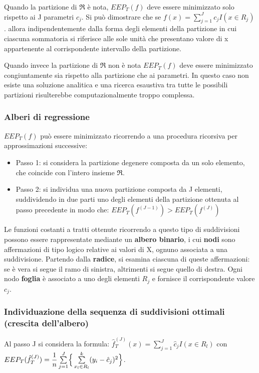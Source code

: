 \documentclass[a4paper]{extarticle}
\begin{document}
Quando la partizione di $\Re$ è nota, $EEP_T(f)$ deve essere minimizzato solo rispetto ai J parametri $c_j$. Si può dimostrare che se $f(x) =  \sum\limits_{j=1}^J c_jI (x \in R_j)$. allora indipendentemente dalla forma degli elementi della partizione in cui ciascuna sommatoria si riferisce alle sole unità che presentano valore di x appartenente al corrispondente intervallo della partizione.

Quando invece la partizione di $\Re$ non è nota $EEP_T(f)$ deve essere minimizzato congiuntamente sia rispetto alla partizione che ai parametri. In questo caso non esiste una soluzione analitica e una ricerca esaustiva tra tutte le possibili partizioni risulterebbe computazionalmente troppo complessa.

\subsubsection{Alberi di regressione}

$EEP_T(f)$ può essere minimizzato ricorrendo a una procedura ricorsiva per approssimazioni successive:
\begin{itemize}
\item Passo 1: si considera la partizione degenere composta da un solo elemento, che coincide con l'intero insieme $\Re$.
\item Passo 2: si individua una nuova partizione composta da J elementi, suddividendo in due parti uno degli elementi della partizione ottenuta al passo precedente in modo che: $EEP_T(f^{(J-1)})>EEP_T(f^{(J)})$
\end{itemize}

Le funzioni costanti a tratti ottenute ricorrendo a questo tipo di suddivisioni possono essere rappresentate mediante un \textbf{albero binario}, i cui \textbf{nodi} sono affermazioni di tipo logico relative ai valori di X, ognuno associata a una suddivisione. Partendo dalla \textbf{radice}, si esamina ciascuna di queste affermazioni: se è vera si segue il ramo di sinistra, altrimenti si segue quello di destra. Ogni nodo \textbf{foglia} è associato a uno degli elementi $R_j$ e fornisce il corrispondente valore $c_j$.

\subsubsection{Individuazione della sequenza di suddivisioni ottimali (crescita dell'albero)}

Al passo J si considera la formula: $\hat f_T^{(J)}(x) = \sum\limits_{j=1}^J \hat c_j I(x \in R_l)$ con $EEP_T(\hat f_T^{(J)})= \dfrac{1}{n}\sum\limits_{j=1}^J \Bigr \{\sum\limits_{x_l \in R_l}^k (y_i - \hat c_j)^2 \Bigl \} $. 
\end{document}
